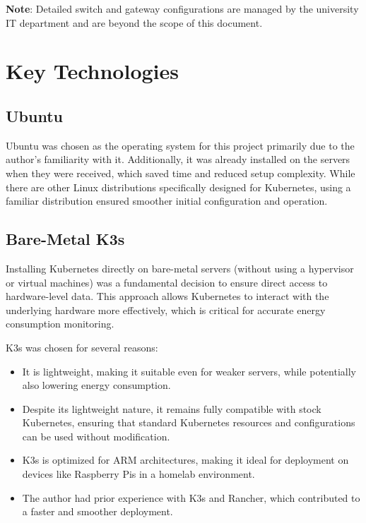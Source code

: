 \textbf{Note}: Detailed switch and gateway configurations are managed by the university IT department and are beyond the scope of this document.

\section{Key Technologies}

\subsection{Ubuntu}
Ubuntu was chosen as the operating system for this project primarily due to the author's familiarity with it. Additionally, it was already installed on the servers when they were received, which saved time and reduced setup complexity. While there are other Linux distributions specifically designed for Kubernetes, using a familiar distribution ensured smoother initial configuration and operation.

\subsection{Bare-Metal K3s}
Installing Kubernetes directly on bare-metal servers (without using a hypervisor or virtual machines) was a fundamental decision to ensure direct access to hardware-level data. This approach allows Kubernetes to interact with the underlying hardware more effectively, which is critical for accurate energy consumption monitoring.

K3s was chosen for several reasons:
\begin{itemize}
\item It is lightweight, making it suitable even for weaker servers, while potentially also lowering energy consumption.
\item Despite its lightweight nature, it remains fully compatible with stock Kubernetes, ensuring that standard Kubernetes resources and configurations can be used without modification.
\item K3s is optimized for ARM architectures, making it ideal for deployment on devices like Raspberry Pis in a homelab environment.
\item The author had prior experience with K3s and Rancher, which contributed to a faster and smoother deployment.
\end{itemize}

